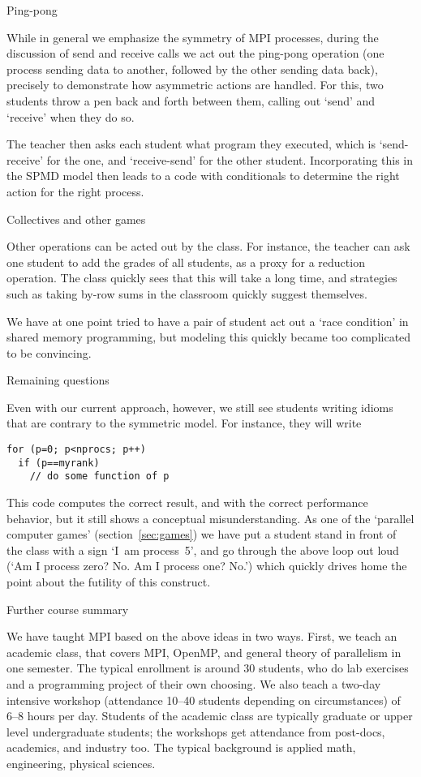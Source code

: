  {Ping-pong}

While in general we emphasize the symmetry of MPI processes, during
the discussion of send and receive calls we act out the ping-pong
operation (one process sending data to another, followed by the other
sending data back), precisely to demonstrate how asymmetric actions
are handled. For this, two students throw a pen back and forth between
them, calling out `send' and `receive' when they do so.

The teacher then asks each student what program they executed, which
is `send-receive' for the one, and `receive-send' for the other
student. Incorporating this in the SPMD model then leads to a code
with conditionals to determine the right action for the right process.

 {Collectives and other games}

Other operations can be acted out by the class. For instance, the
teacher can ask one student to add the grades of all students, as a
proxy for a reduction operation. The class quickly sees that this will
take a long time, and strategies such as taking by-row sums in the
classroom quickly suggest themselves.

We have at one point tried to have a pair of student act out a `race
condition' in shared memory programming, but modeling this quickly
became too complicated to be convincing.

 {Remaining questions}
\label{sec:ploop}

Even with our current approach, however, we still see students writing
idioms that are contrary to the symmetric model. For instance, they
will write
\begin{verbatim}
for (p=0; p<nprocs; p++)
  if (p==myrank)
    // do some function of p
\end{verbatim}
This code computes the correct result, and with the correct
performance behavior, but it still shows a conceptual
misunderstanding. As one of the `parallel computer games'
(section~\ref{sec:games}) we have put a student stand in front of the
class with a sign `I~am process~5', and go through the above loop
out loud (`Am I process zero? No. Am I process one? No.') which
quickly drives home the point about the futility of this construct.

 {Further course summary}
\label{sec:course}

We have taught MPI based on the above ideas in two ways.
First, we teach an academic class,
that covers MPI, OpenMP, and general theory of parallelism in one semester.
The typical enrollment is around 30 students, who do lab exercises and
a programming project of their own choosing.
We also teach a two-day intensive workshop (attendance 10--40 students depending
on circumstances) of 6--8 hours per day. Students of the academic class are typically
graduate or upper level undergraduate students; the workshops get
attendance from post-docs, academics, and industry too. The typical
background is applied math, engineering, physical sciences.

